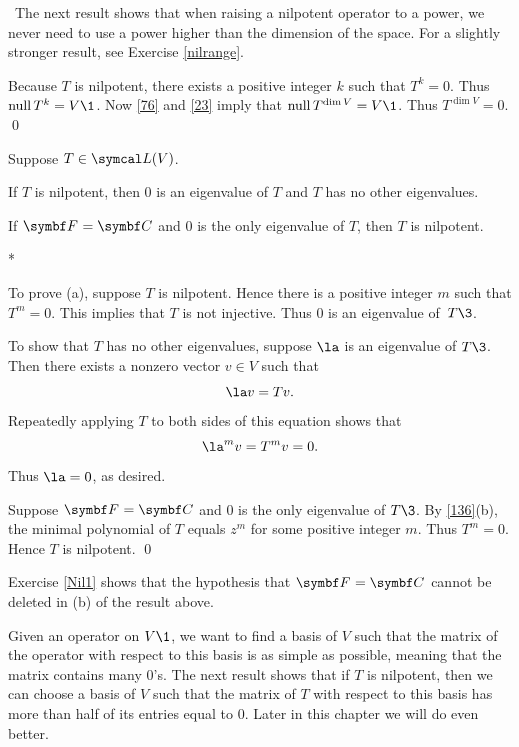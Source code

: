 \
The next result shows that when raising a nilpotent operator to a power, we never need to use a power higher than the dimension of the space. For a slightly stronger result, see Exercise \ref{nilrange}.


\proof
Because $T$ is nilpotent, there exists a positive integer $k$ such that $T^k = 0$. Thus $\ker T^k = V\1$. Now \ref{76} and \ref{23} imply that $\ker T^{\dim V} = V\1$. Thus $T^{\dim V} = 0$.
\qed

{Suppose $T \in \L(V)$.
\begin{subtheorem}
\item
If $T$ is nilpotent, then $0$ is an eigenvalue of $T$ and $T$ has no other \mbox{eigenvalues}.
\item
If $\F{} = \C{}$ and $0$ is the only eigenvalue of $T$, then $T$ is nilpotent.
\end{subtheorem}}

\proof
\begin{subtheorem}*
\item
To prove (a), suppose $T$ is nilpotent. Hence there is a positive integer $m$ such that $T^m = 0$.  This implies that $T$ is
not injective. Thus $0$ is an eigenvalue of~$T\3$.

To show that $T$ has no other eigenvalues, suppose $\la$ is an eigenvalue of $T\3$.  Then there exists a nonzero
vector $v \in V$ such that
\[
\la v = Tv.
\]
Repeatedly applying $T$ to both sides of this equation shows that
\[
\la^m v = T^m v = 0.
\]
Thus $\la = 0$, as desired.

\item
Suppose $\F{} = \C{}$ and $0$ is the only eigenvalue of $T\3$. By \ref{136}(b), the minimal polynomial of $T$ equals $z^m$ for some positive integer $m$. Thus $T^m = 0$. Hence $T$ is nilpotent.
\qed
\end{subtheorem}

Exercise \ref{Nil1} shows that the hypothesis that $\F{} = \C{}$ cannot be deleted in (b) of the result above.

Given an operator on $V\1$, we want to find a basis of $V$ such that the
matrix of the operator with respect to this basis is as simple as possible, meaning that
the matrix contains many $0$'s. The next result shows that if $T$ is nilpotent, then we can choose a basis of $V$ such that the matrix of $T$ with respect  to this basis has more than half of its
entries equal to $0$. Later in this chapter we will do even better.

